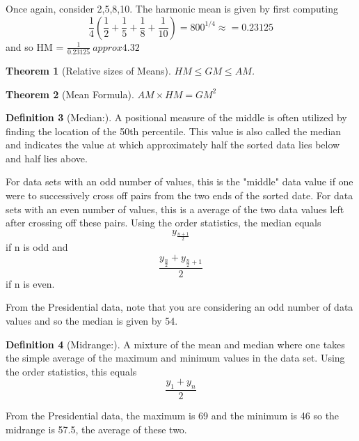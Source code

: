 \documentclass[10pt,]{book}
\theoremstyle{plain}
\newtheorem{theorem}{Theorem}[section]
\theoremstyle{definition}
\newtheorem{definition}[theorem]{Definition}
\theoremstyle{definition}
\theoremstyle{definition}
\numberwithin{equation}{section}
\begin{document}
	Once again, consider {2,5,8,10}. The harmonic mean is given by first computing
	\begin{equation*}\frac{1}{4} (\frac{1}{2} + \frac{1}{5} + \frac{1}{8} + \frac{1}{10}) = 800^{1/4} \approx = 0.23125\end{equation*}
	and so HM = \(\frac{1}{0.23125} \ approx 4.32\)
\begin{theorem}[Relative sizes of Means]\label{theorem-5}
\(HM \le GM \le AM\). \end{theorem}
\begin{theorem}[Mean Formula]\label{theorem-6}
\(AM×HM=GM^2\)\end{theorem}
\begin{definition}[Median:]\label{definition-10}
A positional measure of the middle is often utilized by finding the location of the 50th percentile. This value is also called the median and indicates the value at which approximately half the sorted data lies below and half lies above.%
\end{definition}
\par

For data sets with an odd number of values, this is the "middle" data value if one were to successively cross off pairs from the two ends of the sorted date. For data sets with an even number of values, this is a average of the two data values left after crossing off these pairs.  Using the order statistics, the median equals
\begin{equation*}y_{\frac{n+1}{2}}\end{equation*}
if n is odd and
\begin{equation*}\frac{y_\frac{n}{2} + y_{\frac{n}{2}+1}}{2}\end{equation*}
if n is even.
%
\par
From the Presidential data, note that you are considering an odd number of data values and so the median is given by 54. %
\begin{definition}[Midrange:]\label{definition-11}
A mixture of the mean and median where one takes the simple average of the maximum and minimum values in the data set. Using the order statistics, this equals 
\begin{equation*}\frac{y_1+y_n}{2}\end{equation*}
%
\end{definition}
\par
From the Presidential data, the maximum is 69 and the minimum is 46 so the midrange is 57.5, the average of these two. %
\par
\end{document}
